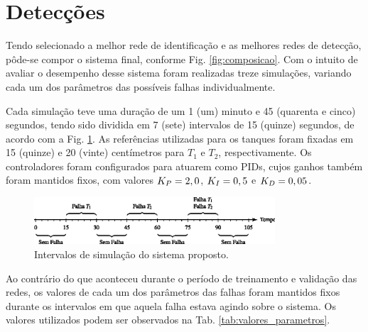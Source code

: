 \section{Detecções}
Tendo selecionado a melhor rede de identificação e as melhores redes de
detecção, pôde-se compor o sistema final, conforme Fig. \ref{fig:composicao}.
Com o intuito de avaliar o desempenho desse sistema foram realizadas treze
simulações, variando cada um dos parâmetros das possíveis falhas
individualmente.

Cada simulação teve uma duração de um 1 (um) minuto e 45 (quarenta e cinco)
segundos, tendo sido dividida em 7 (sete) intervalos de 15 (quinze) segundos, de
acordo com a Fig. \ref{fig:intervalos}. As referências utilizadas para os
tanques foram fixadas em 15 (quinze) e 20 (vinte) centímetros para $T_1$ e
$T_2$, respectivamente. Os controladores foram configurados para atuarem como
PIDs, cujos ganhos também foram mantidos fixos, com valores $K_{\tiny P} = 2,0$,
$K_{\tiny I} = 0,5$ e $K_{\tiny D} = 0,05$.

\begin{figure}[htb]
\centering
    \includegraphics[width=0.8\textwidth]{imgs/resultados/eps/intervalos}
    \caption{Intervalos de simulação do sistema proposto.}
    \label{fig:intervalos}
\end{figure}

Ao contrário do que aconteceu durante o período de treinamento e validação das
redes, os valores de cada um dos parâmetros das falhas foram mantidos fixos
durante os intervalos em que aquela falha estava agindo sobre o sistema. Os
valores utilizados podem ser observados na Tab. \ref{tab:valores_parametros}.

